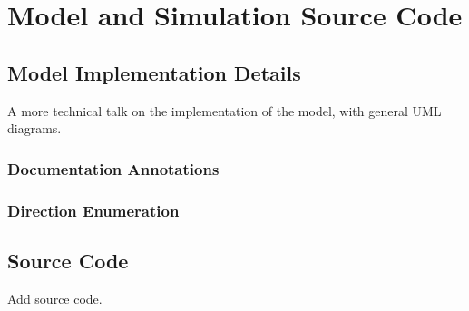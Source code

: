 \chapter{Model and Simulation Source Code}
\label{chapter:model-code}

\section{Model Implementation Details}

A more technical talk on the implementation of the model, with general UML diagrams.

\subsection{Documentation Annotations}
\label{subsec:doc-annotations}

\subsection{Direction Enumeration}
\label{subsec:direction-enum}


\section{Source Code}

Add source code.